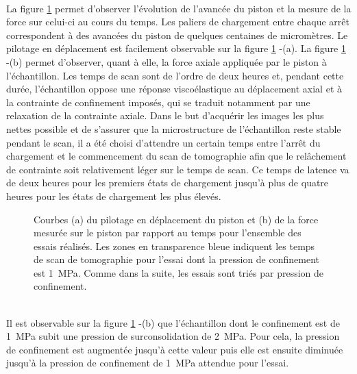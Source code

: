 		\\La figure \ref{fig04:courbes_manip_temps} permet d'observer l'évolution de l'avancée du piston et la mesure de la force sur celui-ci au cours du temps. Les paliers de chargement entre chaque arrêt correspondent à des avancées du piston de quelques centaines de micromètres. Le pilotage en déplacement est facilement observable sur la figure \ref{fig04:courbes_manip_temps} -(a). La figure \ref{fig04:courbes_manip_temps} -(b) permet d'observer, quant à elle, la force axiale appliquée par le piston à l'échantillon. Les temps de scan sont de l'ordre de deux heures et, pendant cette durée, l'échantillon oppose une réponse viscoélastique au déplacement axial et à la contrainte de confinement imposés, qui se traduit notamment par une relaxation de la contrainte axiale. Dans le but d'acquérir les images les plus nettes possible et de s'assurer que la microstructure de l'échantillon reste stable pendant le scan, il a été choisi d'attendre un certain temps entre l'arrêt du chargement et le commencement du scan de tomographie afin que le relâchement de contrainte soit relativement léger sur le temps de scan. Ce temps de latence va de deux heures pour les premiers états de chargement jusqu'à plus de quatre heures pour les états de chargement les plus élevés.
		\begin{figure}\centering
			\hfill
			\caption{\label{fig04:courbes_manip_temps}Courbes (a) du pilotage en déplacement du piston et (b) de la force mesurée sur le piston par rapport au temps pour l'ensemble des essais réalisés. Les zones en transparence bleue indiquent les temps de scan de tomographie pour l'essai dont la pression de confinement est \SI{1}{\mega\pascal}. Comme dans la suite, les essais sont triés par pression de confinement.}
		\end{figure}
		\\Il est observable sur la figure \ref{fig04:courbes_manip_temps} -(b) que l'échantillon dont le confinement est de \SI{1}{\mega\pascal} subit une pression de surconsolidation de \SI{2}{\mega\pascal}. Pour cela, la pression de confinement est augmentée jusqu'à cette valeur puis elle est ensuite diminuée jusqu'à la pression de confinement de \SI{1}{\mega\pascal} attendue pour l'essai.
